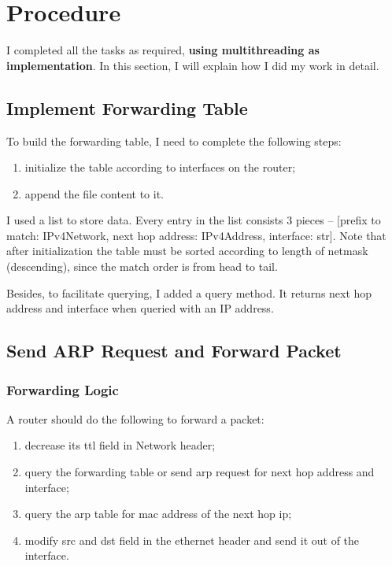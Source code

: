 \documentclass[12pt,a4paper,UTF8]{article}
\begin{document}
\section{Procedure}
I completed all the tasks as required, \textbf{using multithreading as implementation}.
In this section, I will explain how I did my work in detail.

\subsection{Implement Forwarding Table}
To build the forwarding table, I need to complete the following steps:
\begin{enumerate}
	\item initialize the table according to interfaces on the router;
	\item append the file content to it.
\end{enumerate}
I used a list to store data. Every entry in the list consists 3 pieces -- [prefix to match: IPv4Network, next hop address: IPv4Address, interface: str].
Note that after initialization the table must be sorted according to length of netmask (descending), since the match order is from head to tail.

Besides, to facilitate querying, I added a query method. It returns next hop address and interface when queried with an IP address.


\subsection{Send ARP Request and Forward Packet}
\subsubsection{Forwarding Logic}
A router should do the following to forward a packet:
\begin{enumerate}
	\item decrease its ttl field in Network header;
	\item query the forwarding table or send arp request for next hop address and interface;
	\item query the arp table for mac address of the next hop ip;
	\item modify src and dst field in the ethernet header and send it out of the interface.
\end{enumerate}

\end{document}
